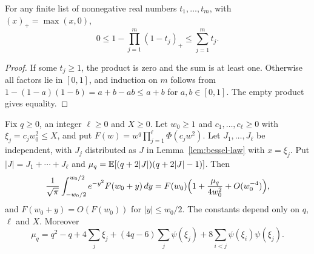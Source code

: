 \begin{lemma}\label{lem:clipped-product}
For any finite list of nonnegative real numbers $t_1,\ldots,t_m$, with
$(x)_+=\max(x,0)$,
\[
0\le1-\prod_{j=1}^m(1-t_j)_+\le\sum_{j=1}^mt_j.
\]
\end{lemma}

\begin{proof}
If some $t_j\ge1$, the product is zero and the sum is at least one. Otherwise all
factors lie in $[0,1]$, and induction on $m$ follows from
$1-(1-a)(1-b)=a+b-ab\le a+b$ for $a,b\in[0,1]$. The empty product gives
equality.
\end{proof}

\begin{lemma}\label{lem:gaussian-phi-average}
Fix $q\ge0$, an integer $\ell\ge0$ and $X\ge0$. Let $w_0\ge1$ and
$c_1,\ldots,c_\ell\ge0$ with $\xi_j=c_jw_0^2\le X$, and put
$F(w)=w^q\prod_{j=1}^\ell\Phi(c_jw^2)$. Let $J_1,\ldots,J_\ell$ be independent,
with $J_j$ distributed as $J$ in Lemma~\ref{lem:bessel-law} with $x=\xi_j$. Put
$|J|=J_1+\cdots+J_\ell$ and $\mu_q=\mathbb E[(q+2|J|)(q+2|J|-1)]$. Then
\[
\frac1{\sqrt\pi}\int_{-w_0/2}^{w_0/2}e^{-y^2}F(w_0+y)\,dy
=F(w_0)\Bigl(1+\frac{\mu_q}{4w_0^2}+O(w_0^{-4})\Bigr),
\]
and $F(w_0+y)=O(F(w_0))$ for $|y|\le w_0/2$. The constants depend only on $q$,
$\ell$ and $X$. Moreover
\[
\mu_q=q^2-q+4\sum_j\xi_j+(4q-6)\sum_j\psi(\xi_j)
+8\sum_{i<j}\psi(\xi_i)\psi(\xi_j).
\]
\end{lemma}

